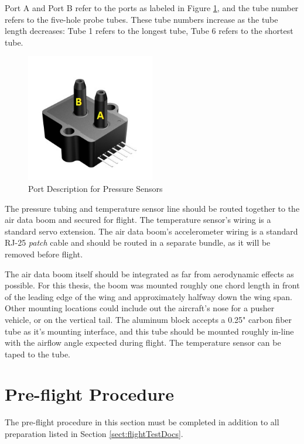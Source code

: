 Port A and Port B refer to the ports as labeled in Figure \ref{fig:pressureLabels}, and the tube number refers to the five-hole probe tubes. These tube numbers increase as the tube length decreases: Tube 1 refers to the longest tube, Tube 6 refers to the shortest tube.

\begin{figure}[H]
  \centering
    \includegraphics[width=0.5\textwidth]{figures/allsensorsPressureLabeled.jpg}
      \caption{Port Description for Pressure Sensors} \label{fig:pressureLabels}
\end{figure}

The pressure tubing and temperature sensor line should be routed together to the air data boom and secured for flight. The temperature sensor's wiring is a standard servo extension. The air data boom's accelerometer wiring is a standard RJ-25 \textit{patch} cable and should be routed in a separate bundle, as it will be removed before flight.

The air data boom itself should be integrated as far from aerodynamic effects as possible. For this thesis, the boom was mounted roughly one chord length in front of the leading edge of the wing and approximately halfway down the wing span. Other mounting locations could include out the aircraft's nose for a pusher vehicle, or on the vertical tail. The aluminum block accepts a 0.25" carbon fiber tube as it's mounting interface, and this tube should be mounted roughly in-line with the airflow angle expected during flight. The temperature sensor can be taped to the tube.

\section{Pre-flight Procedure}
\label{sect:preFlightProc}
The pre-flight procedure in this section must be completed in addition to all preparation listed in Section \ref{sect:flightTestDocs}.

